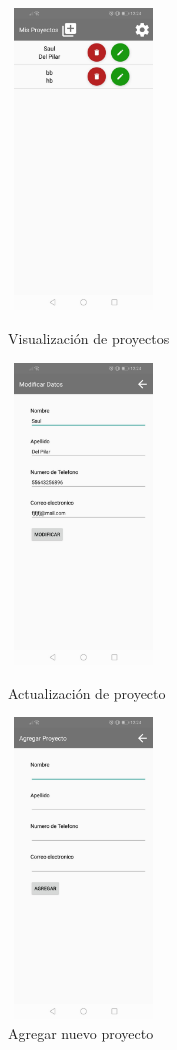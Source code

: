 \begin{figure}[h!]
	\begin{minipage}{0.32\textwidth}
		\centering
		\includegraphics[width=4cm,height=8cm]{imagenes/desarrollo/app/proyectos.jpg}
		\caption{Visualización de proyectos}
		\label{fig:appreadproj}
	\end{minipage}\hfill
	\begin{minipage}{0.32\textwidth}
		\centering
		\includegraphics[width=4cm,height=8cm]{imagenes/desarrollo/app/update_proy.jpg}
		\caption{Actualización de proyecto}
		\label{fig:updateproj}
	\end{minipage}\hfill
	\begin{minipage}{0.32\textwidth}
		\centering
		\includegraphics[width=4cm,height=8cm]{imagenes/desarrollo/app/add_proy.jpg}
		\caption{Agregar nuevo proyecto}
		\label{fig:addproj}
	\end{minipage}\hfill
\end{figure}

